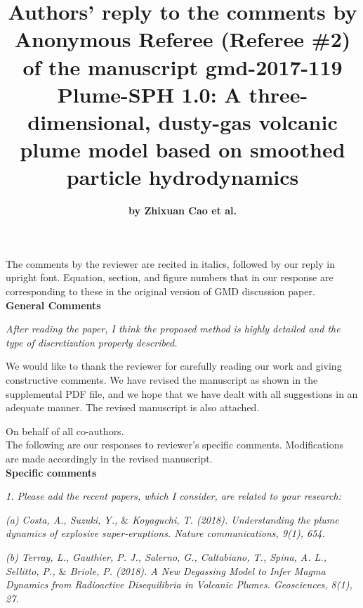 \documentclass[10pt,a4paper]{article}
\begin{document}
\author{\Large \textbf{by Zhixuan Cao et al.}}

\title{ \Large{ Authors' reply to the comments by Anonymous Referee (Referee \#2) of the manuscript gmd-2017-119} \\
\LARGE \textbf{Plume-SPH 1.0: A three-dimensional, dusty-gas volcanic plume model based on smoothed particle hydrodynamics}}

\date{\vspace{-5ex}}

\maketitle
The comments by the reviewer are recited in italics, followed by our reply in upright font. Equation, section, and figure numbers that  in our response are corresponding to these in the original 
version of GMD discussion paper. \\[12pt]

\textbf{\large General Comments}

\textit{After reading the paper, I think the proposed method is highly detailed and the type of discretization properly described.} 

We would like to thank the reviewer for carefully reading our work and giving constructive comments.
We have revised the manuscript as shown in the supplemental PDF file, and we hope that we have dealt with all suggestions in an adequate manner. The revised manuscript is also attached.
 
On behalf of all co-authors. \\[1pt]

The following are our responses to reviewer's specific comments. Modifications are made accordingly in the revised manuscript. \\[12pt]

\textbf{\large Specific comments}

\textit{1. Please add the recent papers, which I consider, are related to your research: }

\textit{(a) Costa, A., Suzuki, Y., $\&$ Koyaguchi, T. (2018). Understanding the plume dynamics of explosive super-eruptions. Nature communications, 9(1), 654.}

\textit{(b) Terray, L., Gauthier, P. J., Salerno, G., Caltabiano, T., Spina, A. L., Sellitto, P., $\&$ Briole, P. (2018). A New Degassing Model to Infer Magma Dynamics from Radioactive Disequilibria in Volcanic Plumes. Geosciences, 8(1), 27.}
\end{document}

